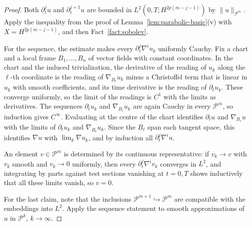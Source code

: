 \documentclass[11pt,reqno]{amsart}
\theoremstyle{definition}
\theoremstyle{remark}
\newcommand{\Pp}{\mathcal{P}}
\newcommand{\norm}[1]{\lVert #1\rVert}
\numberwithin{equation}{section}
\begin{document}
\begin{proof}
Both $\partial_t^ju$ and $\partial_t^{j+1}u$ are bounded in $L^2(0,T;H^{2p(m-j-1)})$ by
$\norm u_{\Pp^m}$. Apply the inequality from the proof of
Lemma~\ref{lem:parabolic-basic}(v) with $X=H^{2p(m-j-1)}$, and then Fact~\ref{fact:sobolev}.

For the sequence, the estimate makes every $\partial_t^j\nabla^iu_k$ uniformly Cauchy. Fix a chart
and a local frame $B_1,\dots,B_n$ of vector fields with constant coordinates. In the chart and the
induced trivialization, the derivative of the reading of $u_k$ along the $\ell$-th coordinate is the
reading of $\nabla_{B_\ell}u_k$ minus a Christoffel term that is linear in $u_k$ with smooth
coefficients, and its time derivative is the reading of $\partial_tu_k$. These converge uniformly, so
the limit of the readings is $C^1$ with the limits as derivatives. The sequences
$\partial_tu_k$ and $\nabla_{B_\ell}u_k$ are again Cauchy in every $\Pp^m$, so induction gives
$C^\infty$. Evaluating at the centre of the chart identifies $\partial_tu$ and $\nabla_{B_\ell}u$ with
the limits of $\partial_tu_k$ and $\nabla_{B_\ell}u_k$. Since the $B_\ell$ span each tangent space, this
identifies $\nabla u$ with $\lim_k \nabla u_k$, and by induction all $\partial_t^j\nabla^iu$.

An element $v\in\Pp^m$ is determined by its continuous representative: if $v_k\to v$ with $v_k$ smooth
and $v_k\to0$ uniformly, then every $\partial_t^j\nabla^iv_k$ converges in $L^2$, and integrating by parts
against test sections vanishing at $t=0,T$ shows inductively that all these limits vanish, so $v=0$.

For the last claim, note that the inclusions $\Pp^{m+1}\hookrightarrow\Pp^m$ are compatible with the
embeddings into $L^2$. Apply the sequence statement to smooth approximations of $u$ in $\Pp^k$, $k\to\infty$.
\end{proof}
\end{document}

